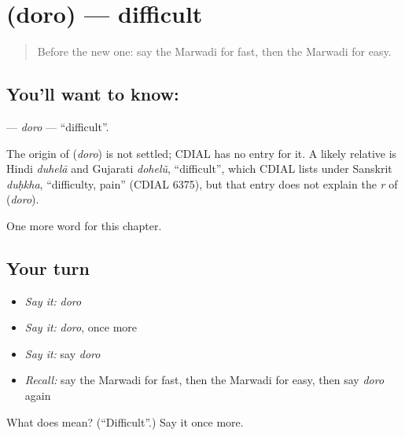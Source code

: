 \section[\texorpdfstring{\mw{दोरो} (doro)}{दोरो (doro)}]{ (doro) — difficult}

\label{lesson:MW-C74-doro}



\begin{quote}
Before the new one: say the Marwadi for fast, then the Marwadi for easy.
\end{quote}

\subsection*{You'll want to know: }
\textbf{} — \emph{doro} — \textquotedblleft{}difficult\textquotedblright{}.

\begin{cousinweb}
The origin of \textbf{} (\emph{doro}) is not settled; CDIAL has no entry for it. A likely relative is Hindi \emph{duhelā} and Gujarati \emph{dohelũ}, \textquotedblleft{}difficult\textquotedblright{}, which CDIAL lists under Sanskrit \emph{duḥkha}, \textquotedblleft{}difficulty, pain\textquotedblright{} (CDIAL 6375), but that entry does not explain the \emph{r} of \textbf{} (\emph{doro}).
\end{cousinweb}

\begin{grammarlens}[title={What you've built}]
One more word for this chapter.
\end{grammarlens}

\subsection*{Your turn}
\begin{itemize}
\raggedright
  \item \emph{Say it:} \emph{doro}
  \item \emph{Say it:} \emph{doro}, once more
  \item \emph{Say it:} say \emph{doro}
  \item \emph{Recall:} say the Marwadi for fast, then the Marwadi for easy, then say \emph{doro} again
\end{itemize}

\begin{tcolorbox}[breakable,colback=teal!4,colframe=teal!35!black,title={Before you move on}]
What does  mean? (\textquotedblleft{}Difficult\textquotedblright{}.) Say it once more.
\end{tcolorbox}
